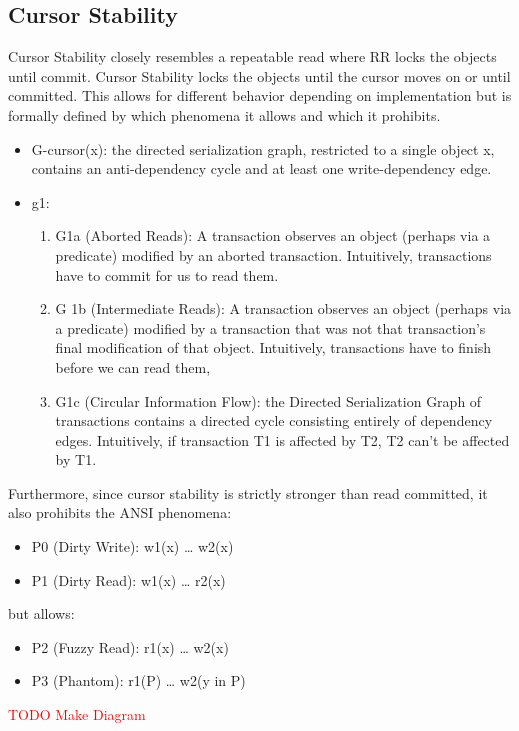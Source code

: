 \documentclass[a4paper,10pt,titlepage]{report}
\begin{document}
\subsection{Cursor Stability}
Cursor Stability closely resembles a repeatable read where RR locks the objects until commit. Cursor Stability locks the objects until the cursor moves on or until committed. This allows for different behavior depending on implementation but is formally defined by which phenomena it allows and which it prohibits.
\cite{Adya99weakconsistency}\\
\begin{itemize}
\item G-cursor(x): the directed serialization graph, restricted to a single object x, contains an anti-dependency cycle and at least one write-dependency edge.
\item g1:
\begin{enumerate}
\item G1a (Aborted Reads): A transaction observes an object (perhaps via a predicate) modified by an aborted transaction. Intuitively, transactions have to commit for us to read them.
\item G 1b (Intermediate Reads): A transaction observes an object (perhaps via a predicate) modified by a transaction that was not that transaction's final modification of that object. Intuitively, transactions have to finish before we can read them,
\item G1c (Circular Information Flow): the Directed Serialization Graph of transactions contains a directed cycle consisting entirely of dependency edges. Intuitively, if transaction T1 is affected by T2, T2 can't be affected by T1.
\end{enumerate}
\end{itemize}
Furthermore, since cursor stability is strictly stronger than read committed, it also prohibits the ANSI phenomena:
\begin{itemize}
\item P0 (Dirty Write): w1(x) … w2(x)
\item P1 (Dirty Read): w1(x) … r2(x)
\end{itemize}

but allows:
\begin{itemize}
\item P2 (Fuzzy Read): r1(x) … w2(x)
\item P3 (Phantom): r1(P) … w2(y in P)
\end{itemize}


\textcolor{red}{TODO Make Diagram}
\end{document}
